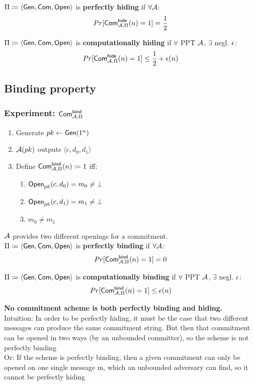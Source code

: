 \documentclass[12pt]{article}
\begin{document}
$\Pi \coloneqq \langle \operatorname{\mathsf{Gen}}, \operatorname{\mathsf{Com}}, \operatorname{\mathsf{Open}} \rangle$ is \textbf{perfectly hiding} if $\forall \mathcal{A}$:
\begin{equation*}
	Pr[\operatorname{\mathsf{Com}}_{\mathcal{A},\Pi}^\mathsf{hide}(n)=1] = \frac12
\end{equation*}

$\Pi \coloneqq \langle \operatorname{\mathsf{Gen}}, \operatorname{\mathsf{Com}}, \operatorname{\mathsf{Open}} \rangle$ is \textbf{computationally hiding} if $\forall$ PPT $\mathcal{A}$, $\exists$ negl. $\epsilon$:
\begin{equation*}
	Pr[\operatorname{\mathsf{Com}}_{\mathcal{A},\Pi}^\mathsf{hide}(n)=1] \le \frac12 + \epsilon(n)
\end{equation*}
\newpage
\subsection{Binding property}
\subsubsection{Experiment: $\operatorname{\mathsf{Com}}_{\mathcal{A},\Pi}^\mathsf{bind}$}
\begin{enumerate}
	\item Generate $pk \leftarrow \operatorname{\mathsf{Gen}}(1^n)$
	\item $\mathcal{A}(pk)$ outputs $\langle c,d_0, d_1 \rangle$
	\item Define $\operatorname{\mathsf{Com}}_{\mathcal{A},\Pi}^\mathsf{bind}(n) \coloneqq 1$ iff:
	\begin{enumerate}
		\item $\operatorname{\mathsf{Open}}_{pk}(c,d_0)=m_0 \neq \bot$
		\item $\operatorname{\mathsf{Open}}_{pk}(c,d_1)=m_1 \neq \bot$
		\item $m_0 \neq m_1$
	\end{enumerate}
\end{enumerate}
$\mathcal{A}$ provides two different openings for a commitment.\\

$\Pi \coloneqq \langle \operatorname{\mathsf{Gen}}, \operatorname{\mathsf{Com}}, \operatorname{\mathsf{Open}} \rangle$ is \textbf{perfectly binding} if $\forall \mathcal{A}$:
\begin{equation*}
	Pr[\operatorname{\mathsf{Com}}_{\mathcal{A},\Pi}^\mathsf{bind}(n)=1] = 0
\end{equation*}

$\Pi \coloneqq \langle \operatorname{\mathsf{Gen}}, \operatorname{\mathsf{Com}}, \operatorname{\mathsf{Open}} \rangle$ is \textbf{computationally binding} if $\forall$ PPT $\mathcal{A}$, $\exists$ negl. $\epsilon$:
\begin{equation*}
	Pr[\operatorname{\mathsf{Com}}_{\mathcal{A},\Pi}^\mathsf{bind}(n)=1] \le \epsilon(n)
\end{equation*}


\textbf{No commitment scheme is both perfectly binding and hiding.}\\
Intuition: In order to be perfectly hiding, it must be the case that two different messages can produce the same commitment string. But then that commitment can be opened in two ways (by an unbounded committer), so the scheme is not perfectly binding\\
Or:  If the scheme is perfectly binding, then a given commitment can only be opened on one single message m, which an unbounded adversary can find, so it cannot be perfectly hiding
\end{document}
